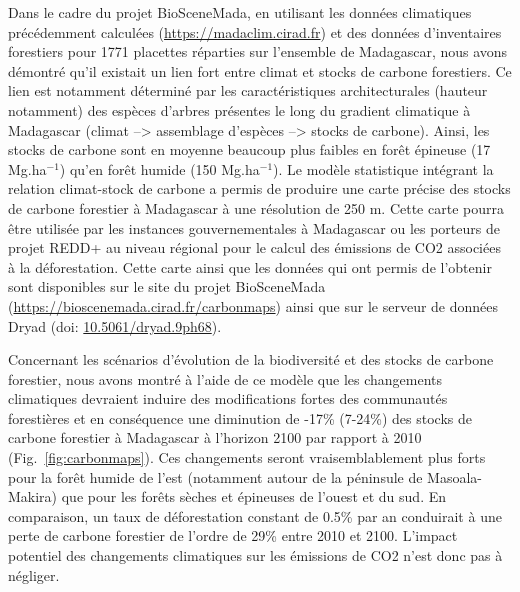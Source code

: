 \documentclass[12pt,]{article}
\begin{document}
Dans le cadre du projet BioSceneMada, en utilisant les données
climatiques précédemment calculées (\url{https://madaclim.cirad.fr}) et
des données d'inventaires forestiers pour 1771 placettes réparties sur
l'ensemble de Madagascar, nous avons démontré qu'il existait un lien
fort entre climat et stocks de carbone forestiers. Ce lien est notamment
déterminé par les caractéristiques architecturales (hauteur notamment)
des espèces d'arbres présentes le long du gradient climatique à
Madagascar (climat --\textgreater{} assemblage d'espèces
--\textgreater{} stocks de carbone). Ainsi, les stocks de carbone sont
en moyenne beaucoup plus faibles en forêt épineuse (17 Mg.ha\(^{-1}\))
qu'en forêt humide (150 Mg.ha\(^{-1}\)). Le modèle statistique intégrant
la relation climat-stock de carbone a permis de produire une carte
précise des stocks de carbone forestier à Madagascar à une résolution de
250 m. Cette carte pourra être utilisée par les instances
gouvernementales à Madagascar ou les porteurs de projet REDD+ au niveau
régional pour le calcul des émissions de CO2 associées à la
déforestation. Cette carte ainsi que les données qui ont permis de
l'obtenir sont disponibles sur le site du projet BioSceneMada
(\url{https://bioscenemada.cirad.fr/carbonmaps}) ainsi que sur le
serveur de données Dryad (doi:
\href{http://doi.org/10.5061/dryad.9ph68}{10.5061/dryad.9ph68}).

Concernant les scénarios d'évolution de la biodiversité et des stocks de
carbone forestier, nous avons montré à l'aide de ce modèle que les
changements climatiques devraient induire des modifications fortes des
communautés forestières et en conséquence une diminution de -17\%
(7-24\%) des stocks de carbone forestier à Madagascar à l'horizon 2100
par rapport à 2010 (Fig.~\ref{fig:carbonmaps}). Ces changements seront
vraisemblablement plus forts pour la forêt humide de l'est (notamment
autour de la péninsule de Masoala-Makira) que pour les forêts sèches et
épineuses de l'ouest et du sud. En comparaison, un taux de déforestation
constant de 0.5\% par an conduirait à une perte de carbone forestier de
l'ordre de 29\% entre 2010 et 2100. L'impact potentiel des changements
climatiques sur les émissions de CO2 n'est donc pas à négliger.
\end{document}
